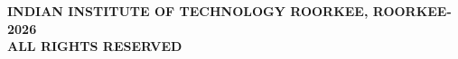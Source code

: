 \thispagestyle{empty}
\vspace*{80mm}
{
 \begin{center}
 	{
 		\bfseries
		\selectfont\textcopyright INDIAN INSTITUTE OF TECHNOLOGY ROORKEE, ROORKEE-2026\\
		ALL RIGHTS RESERVED
	}
 \end{center}
}
